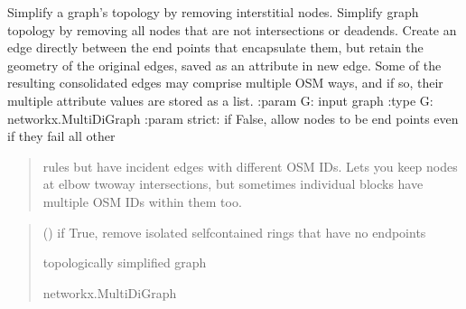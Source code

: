 \documentclass[letterpaper,10pt,english]{sphinxmanual}
\begin{document}
\begin{fulllineitems}
\label{\detokenize{pysewer:pysewer.simplify.simplify_graph}}
\pysigstartsignatures
{}
\pysigstopsignatures
\sphinxAtStartPar
Simplify a graph’s topology by removing interstitial nodes.
Simplify graph topology by removing all nodes that are not intersections
or dead\sphinxhyphen{}ends. Create an edge directly between the end points that
encapsulate them, but retain the geometry of the original edges, saved as
an attribute in new edge. Some of the resulting consolidated edges may
comprise multiple OSM ways, and if so, their multiple attribute values are
stored as a list.
:param G: input graph
:type G: networkx.MultiDiGraph
:param strict: if False, allow nodes to be end points even if they fail all other
\begin{quote}

\sphinxAtStartPar
rules but have incident edges with different OSM IDs. Lets you keep
nodes at elbow two\sphinxhyphen{}way intersections, but sometimes individual blocks
have multiple OSM IDs within them too.
\end{quote}
\begin{quote}\begin{description}
\sphinxAtStartPar
{} () \textendash{} if True, remove isolated self\sphinxhyphen{}contained rings that have no endpoints

\sphinxAtStartPar
{} \textendash{} topologically simplified graph

\sphinxAtStartPar
networkx.MultiDiGraph

\end{description}\end{quote}

\end{fulllineitems}
\end{document}
